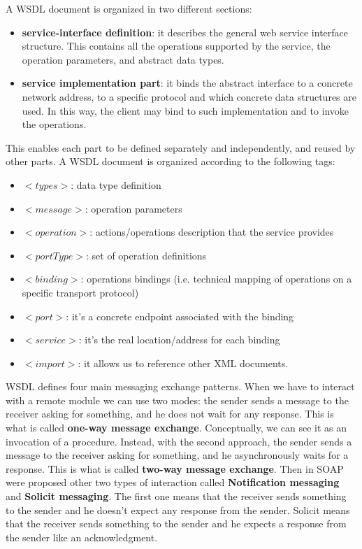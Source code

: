 A WSDL document is organized in two different sections:
\begin{itemize}
    \item \textbf{service-interface definition}: it describes the general web service interface structure. This contains all the operations supported by the service, the operation parameters, and abstract data types.
    \item \textbf{service implementation part}: it binds the abstract interface to a concrete network address, to a specific protocol and which concrete data structures are used. In this way, the client may bind to such implementation and to invoke the operations.
\end{itemize}
This enables each part to be defined separately and independently, and reused by other parts.
A WSDL document is organized according to the following tags:
\begin{itemize}
    \item $<types>$: data type definition
    \item $<message>$: operation parameters
    \item $<operation>$: actions/operations description that the service provides
    \item $<portType>$: set of operation definitions
    \item $<binding>$: operations bindings (i.e. technical mapping of operations on a specific transport protocol)
    \item $<port>$: it's a concrete endpoint associated with the binding
    \item $<service>$: it's the real location/address for each binding
    \item $<import>$: it allows us to reference other XML documents.
\end{itemize}
WSDL defines four main messaging exchange patterns. When we have to interact with a remote module we can use two modes: the sender sends a message to the receiver asking for something, and he does not wait for any response. This is what is called \textbf{one-way message exchange}.
Conceptually, we can see it as an invocation of a procedure.
Instead, with the second approach, the sender sends a message to the receiver asking for something, and he asynchronously waits for a response.
This is what is called \textbf{two-way message exchange}.
Then in SOAP were proposed other two types of interaction called \textbf{Notification messaging} and \textbf{Solicit messaging}.
The first one means that the receiver sends something to the sender and he doesn't expect any response from the sender. Solicit means that the receiver sends something to the sender and he expects a response from the sender like an acknowledgment.


